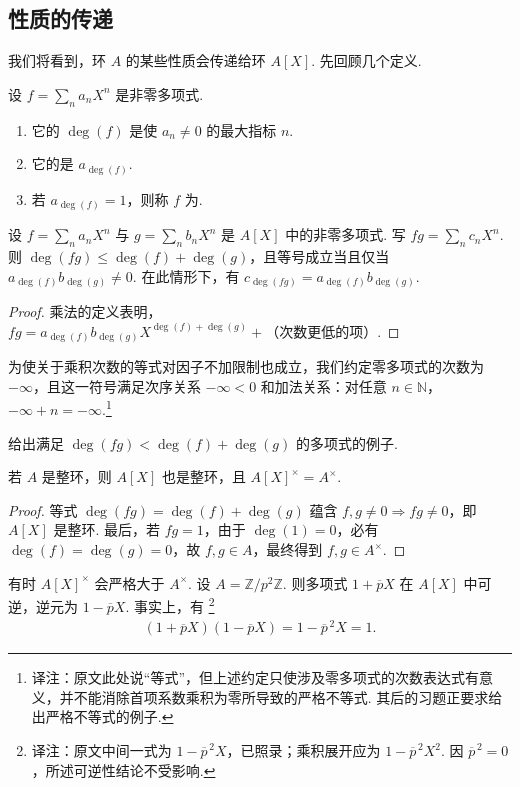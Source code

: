 \subsection{性质的传递}\label{sec:galois-1-4-3}
我们将看到，环 $A$ 的某些性质会传递给环 $A[X]$. 先回顾几个定义.
\begin{definition*}
设 $f=\sum_n a_nX^n$ 是非零多项式.
\begin{enumerate}
\item[i)] 它的 $\deg(f)$ 是使 $a_n\ne0$ 的最大指标 $n$.
\item[ii)] 它的是 $a_{\deg(f)}$.
\item[iii)] 若 $a_{\deg(f)}=1$，则称 $f$ 为.
\end{enumerate}
\end{definition*}
\begin{proposition*}
设 $f=\sum_n a_nX^n$ 与 $g=\sum_n b_nX^n$ 是 $A[X]$ 中的非零多项式. 写 $fg=\sum_n c_nX^n$. 则 $\deg(fg)\leq\deg(f)+\deg(g)$，且等号成立当且仅当 $a_{\deg(f)}b_{\deg(g)}\ne0$. 在此情形下，有 $c_{\deg(fg)}=a_{\deg(f)}b_{\deg(g)}$.
\end{proposition*}
\begin{proof}
乘法的定义表明，$fg=a_{\deg(f)}b_{\deg(g)}X^{\deg(f)+\deg(g)}+\text{（次数更低的项）}$.
\end{proof}
\begin{remark*}
为使关于乘积次数的等式对因子不加限制也成立，我们约定零多项式的次数为 $-\infty$，且这一符号满足次序关系 $-\infty<0$ 和加法关系：对任意 $n\in\mathbb N$，$-\infty+n=-\infty$.\footnote{译注：原文此处说``等式''，但上述约定只使涉及零多项式的次数表达式有意义，并不能消除首项系数乘积为零所导致的严格不等式. 其后的习题正要求给出严格不等式的例子.}
\end{remark*}
\begin{exercise*}
给出满足 $\deg(fg)<\deg(f)+\deg(g)$ 的多项式的例子.
\end{exercise*}
\begin{corollary*}
若 $A$ 是整环，则 $A[X]$ 也是整环，且 $A[X]^\times=A^\times$.
\end{corollary*}
\begin{proof}
等式 $\deg(fg)=\deg(f)+\deg(g)$ 蕴含 $f,g\ne0\Rightarrow fg\ne0$，即 $A[X]$ 是整环. 最后，若 $fg=1$，由于 $\deg(1)=0$，必有 $\deg(f)=\deg(g)=0$，故 $f,g\in A$，最终得到 $f,g\in A^\times$.
\end{proof}
\begin{example*}
有时 $A[X]^\times$ 会严格大于 $A^\times$. 设 $A=\mathbb Z/p^2\mathbb Z$. 则多项式 $1+\overline pX$ 在 $A[X]$ 中可逆，逆元为 $1-\overline pX$. 事实上，有
\footnote{译注：原文中间一式为 $1-\overline p^{\,2}X$，已照录；乘积展开应为 $1-\overline p^{\,2}X^2$. 因 $\overline p^{\,2}=0$，所述可逆性结论不受影响.}
\begin{align*}
(1+\overline pX)(1-\overline pX)=1-\overline p^{\,2}X=1.
\end{align*}
\end{example*}
